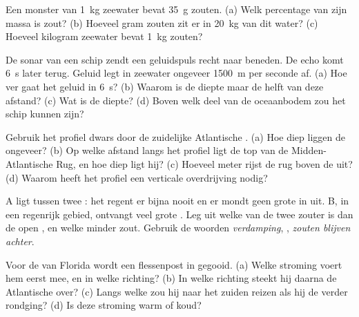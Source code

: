 \begin{exercise}[$\star\star$]\label{exo:g8:the-oceans:5}
Een monster van \qty{1}{kg} zeewater bevat \qty{35}{g} zouten. (a)
Welk percentage van zijn massa is zout? (b) Hoeveel gram zouten zit er in
\qty{20}{kg} van dit water? (c) Hoeveel kilogram zeewater bevat
\qty{1}{kg} zouten?
\end{exercise}

\begin{exercise}[$\star\star$]\label{exo:g8:the-oceans:6}
De sonar van een schip zendt een geluidspuls recht naar beneden. De echo
komt \qty{6}{s} later terug. Geluid legt in zeewater ongeveer
\qty{1500}{m} per seconde af. (a) Hoe ver gaat het geluid in \qty{6}{s}?
(b) Waarom is de diepte maar de helft van deze afstand? (c) Wat is de
diepte? (d) Boven welk deel van de oceaanbodem zou het schip kunnen zijn?
\end{exercise}

\begin{exercise}[$\star\star$]\label{exo:g8:the-oceans:7}
Gebruik het profiel dwars door de zuidelijke Atlantische . (a) Hoe
diep liggen de  ongeveer? (b) Op welke afstand langs het
profiel ligt de top van de Midden-Atlantische Rug, en hoe diep ligt hij?
(c) Hoeveel meter rijst de rug boven de  uit? (d) Waarom heeft het
profiel een verticale overdrijving nodig?
\end{exercise}

\begin{exercise}[$\star\star$]\label{exo:g8:the-oceans:8}
 A ligt tussen twee : het regent er bijna nooit en er mondt
geen grote  in uit.  B, in een regenrijk gebied, ontvangt veel
grote . Leg uit welke van de twee zouter is dan de open , en
welke minder zout. Gebruik de woorden \emph{verdamping}, \emph{}, \emph{zouten blijven achter}.
\end{exercise}

\begin{exercise}[$\star\star$]\label{exo:g8:the-oceans:9}
Voor de  van Florida wordt een flessenpost in  gegooid. (a) Welke
stroming voert hem eerst mee, en in welke richting? (b) In welke richting
steekt hij daarna de Atlantische  over? (c) Langs welke  zou hij
naar het zuiden reizen als hij de  verder rondging? (d) Is deze
stroming warm of koud?
\end{exercise}

